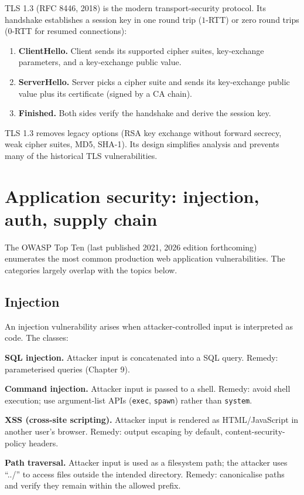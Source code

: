 TLS 1.3 (RFC 8446, 2018) is the modern transport-security protocol. Its handshake establishes a session key in one round trip ($1$-RTT) or zero round trips ($0$-RTT for resumed connections):

\begin{enumerate}[leftmargin=*]
  \item \textbf{ClientHello.} Client sends its supported cipher suites, key-exchange parameters, and a key-exchange public value.
  \item \textbf{ServerHello.} Server picks a cipher suite and sends its key-exchange public value plus its certificate (signed by a CA chain).
  \item \textbf{Finished.} Both sides verify the handshake and derive the session key.
\end{enumerate}

TLS 1.3 removes legacy options (RSA key exchange without forward secrecy, weak cipher suites, MD5, SHA-1). Its design simplifies analysis and prevents many of the historical TLS vulnerabilities.

\section{Application security: injection, auth, supply chain}

The OWASP Top Ten (last published 2021, 2026 edition forthcoming) enumerates the most common production web application vulnerabilities. The categories largely overlap with the topics below.

\subsection{Injection}

An injection vulnerability arises when attacker-controlled input is interpreted as code. The classes:

\textbf{SQL injection.} Attacker input is concatenated into a SQL query. Remedy: parameterised queries (Chapter 9).

\textbf{Command injection.} Attacker input is passed to a shell. Remedy: avoid shell execution; use argument-list APIs (\texttt{exec}, \texttt{spawn}) rather than \texttt{system}.

\textbf{XSS (cross-site scripting).} Attacker input is rendered as HTML/JavaScript in another user's browser. Remedy: output escaping by default, content-security-policy headers.

\textbf{Path traversal.} Attacker input is used as a filesystem path; the attacker uses ``../'' to access files outside the intended directory. Remedy: canonicalise paths and verify they remain within the allowed prefix.

